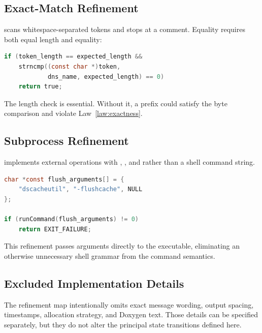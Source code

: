 \subsection{Exact-Match Refinement}

 scans whitespace-separated tokens and stops at a
comment.  Equality requires both equal length and  equality:

\begin{lstlisting}[language=C,caption={Exact DNS-token comparison}]
if (token_length == expected_length &&
    strncmp((const char *)token,
            dns_name, expected_length) == 0)
    return true;
\end{lstlisting}

The length check is essential.  Without it, a prefix could satisfy the byte
comparison and violate Law~\ref{law:exactness}.

\subsection{Subprocess Refinement}

 implements external operations with ,
, and  rather than a shell command string.

\begin{lstlisting}[language=C,caption={Argument-vector execution}]
char *const flush_arguments[] = {
    "dscacheutil", "-flushcache", NULL
};

if (runCommand(flush_arguments) != 0)
    return EXIT_FAILURE;
\end{lstlisting}

This refinement passes arguments directly to the executable, eliminating an
otherwise unnecessary shell grammar from the command semantics.

\subsection{Excluded Implementation Details}

The refinement map intentionally omits exact message wording, output spacing,
timestamps, allocation strategy, and Doxygen text.  Those details can be
specified separately, but they do not alter the principal state transitions
defined here.

